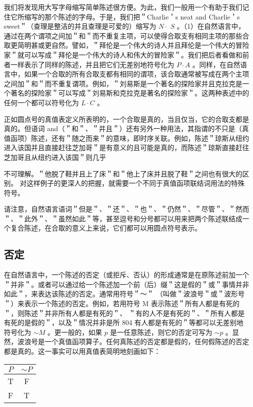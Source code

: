 我们将发现用大写字母缩写简单陈述很方便。为此，我们一般用一个有助于我们记住它所缩写的那个陈述的字母。于是，我们把＂Charlie＇s neat and Charlie＇s sweet＂（查理是整洁的并且查理是可爱的）缩写为 $N \cdot$ $S$ 。（1）在自然语言中，通过在两个谓项之间加＂和＂而不重复主项，可以使得合取支有相同主项的那些合取更简明甚或更自然。譬如，＂拜伦是一个伟大的诗人并且拜伦是一个伟大的冒险家＂就可以写成＂拜伦是一个伟大的诗人和伟大的冒险家＂。我们把后者看做和前者一样表示了同样的陈述，并且把它们无差别地符号化为 $P \cdot A$ 。同样，在自然语言中，如果一个合取的所有合取支都有相同的谓项，该合取通常被写成在两个主项之间加＂和＂而不重复谓项。例如，＂刘易斯是一个著名的探险家并且克拉克是一个著名的探险家＂可以写成＂刘易斯和克拉克是著名的探险家＂。这两种表述中的任何一个都可以符号化为 $L \cdot C$ 。

正如圆点号的真值表定义所表明的，一个合取是真的，当且仅当，它的合取支都是真的。但语词 and（＂和＂、＂并且＂）还有另外一种用法，其指谓的不只是（真值函项）陈述，还有＂随之而来＂的意味，即时序关联。例如，陈述＂琼斯从纽约进入该国并且直接赶往芝加哥＂是有意义的且可能是真的，而陈述＂琼斯直接赶往芝加哥且从纽约进入该国＂则几乎

不可理解。＂他脱了鞋并且上了床＂和＂他上了床并且脱了鞋＂之间也有很大的区别。\cite{grice1975} 对这样例子的更深人的把握，就需要一个不同于真值函项联结词用法的特殊符号。

请注意，自然语言语词＂但是＂、＂还＂、＂也＂、＂仍然＂、＂尽管＂、＂然而＂、＂此外＂、＂虽然如此＂等，甚至逗号和分号都可以用来把两个陈述联结成一个复合陈述，在合取的意义上来说，它们都可以用圆点符号表示。

\subsection{否定}
在自然语言中，一个陈述的否定（或拒斥、否认）的形成通常是在原陈述前加一个＂并非＂。或者可以通过给一个陈述加一个前（后）缀＂这是假的＂或＂事情并非如此＂，来表达该陈述的否定。通常用符号＂～＂ （叫做＂波浪号＂或＂波形号＂）来表示一个陈述的否定。例如，若用符号 M 表示陈述＂所有人都是有死的＂，则陈述＂并非所有人都是有死的＂、 ＂有的人不是有死的＂、＂所有人都是有死的是假的＂，以及＂情况并非是所 804 有人都是有死的＂等都可以无差别地符号化为 $\sim M$ 。更一般的，如果 $p$ 是一任意陈述，则它的否定可写为 $\sim p$ 。显然，波浪号是一个真值函项算子。任何真陈述的否定都是假的，任何假陈述的否定都是真的。这一事实可以用真值表简明地刻画如下：

\begin{center}
\begin{tabular}{|cc|}
\hline
$P$ & $\sim P$ \\
\hline
T & F \\
F & T \\
\hline
\end{tabular}
\end{center}

